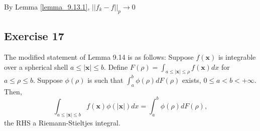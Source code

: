 \documentclass{article}
\newcommand\abs[1]{\left|#1\right|}
\newtheorem{lemma}{Lemma}
\newcommand\xx{\mathbf{x}}
\begin{document}
By Lemma \ref{lemma_9.13.1}, $||f_k - f||_p \to 0$


\subsection{Exercise 17} %

The modified statement of Lemma 9.14 is as follows: Suppose $f(\xx)$ is integrable over a spherical shell $a \leq \abs{\xx} \leq b$. Define $F(\rho) = \int_{a \leq \abs{\xx} \leq \rho} f(\xx) dx$ for $a \leq \rho \leq b$. Suppose $\phi(\rho)$ is such that $\int_{a}^{b} \phi(\rho) dF(\rho)$ exists, $0 \leq a < b < +\infty$. Then, 
\begin{equation*}
	\int_{a \leq \abs{\xx} \leq b} f(\xx) \phi(\abs{\xx}) dx = \int_{a}^{b} \phi(\rho) dF(\rho), 
\end{equation*}
the RHS a Riemann-Stieltjes integral.

\iffalse
\typstmathinputenable{\$}
First we prove a lemma, this is needed to reduce to the case where $f≥ 0$.
\begin{lemma}
    If $∫ φ dif F$ exists, $F$ bounded variation, let $F=P-N$ be its Jordan decomposition where $P$ and $N$ are monotonically increasing, then $∫ φ dif P$ exists.
\end{lemma}
\begin{proof}
    We will prove the existence of $∫ φ dif P$  using the Cauchy criterion.

    Given any $ε>0$, we prove there exist $Γ$ such that for any partitions $Γ₁, Γ₂$ finer than $Γ$, then $|R_Γ₁[φ, P]-R_Γ₂[φ, P]|<ε$.

    To do that, because $∫ φ dif F$ exists, we can pick $Γ$ such that for any partitions
    $Γ₃, Γ₄$ finer than $Γ$, then $|R_Γ₃[φ, F]-R_Γ₄[φ, F]|<ε/2$.

    Note that $R_Γ₃[φ, F] = P_Γ₃[φ, F] - N_Γ₃[φ, F]$ where
    $R_Γ₃[φ, F] = ∑ φ(ξ_i) (f(x_i)-f(x_(i-1)))$ is the usual Riemann-Stieltjes sum,
    $P_Γ₃[φ, F] = ∑ φ(ξ_i) (f(x_i)-f(x_(i-1)))⁺$
    and
    $N_Γ₃[φ, F] = ∑ φ(ξ_i) (f(x_i)-f(x_(i-1)))⁻$.

    Specializing the above to the case $Γ₄=Γ₃=Γ$, we get that %
    $|R_Γ[φ, F]-R'_Γ[φ, F]|<ε/2$ for any two choices ${ξ_i},{ξ'_i}$.
    
    Taking the $sup$ over all choices of $ξ_i$, this means $∑ |sup φ(ξ_i) - inf φ(ξ_i)| ⋅ |f(x_i)-f(x_(i-1))| ≤ ε/2$.
    Which implies $∑ |sup φ(ξ_i) - inf φ(ξ_i)| ⋅ (f(x_i)-f(x_(i-1)))⁺ ≤ ε/2$.

    \iffalse
    So, for any partition $Γ₃$ finer than $Γ$,
    $|P_Γ₃[φ, F] - P'_Γ₃[φ, F]| ≤ ε/2$, where $P$ and $P'$ are across two different ways of choosing $ξ$.
    \fi

    Thus, for any two partitions $Γ₃$ and $Γ₄$ finer than $Γ$, 
    we have
    $|P_Γ₃[φ, F] - P_Γ₄[φ, F]| ≤ ε/2 < ε$, so we're done.
\end{proof}
\typstmathinputdisable{\$}
\fi
\end{document}
